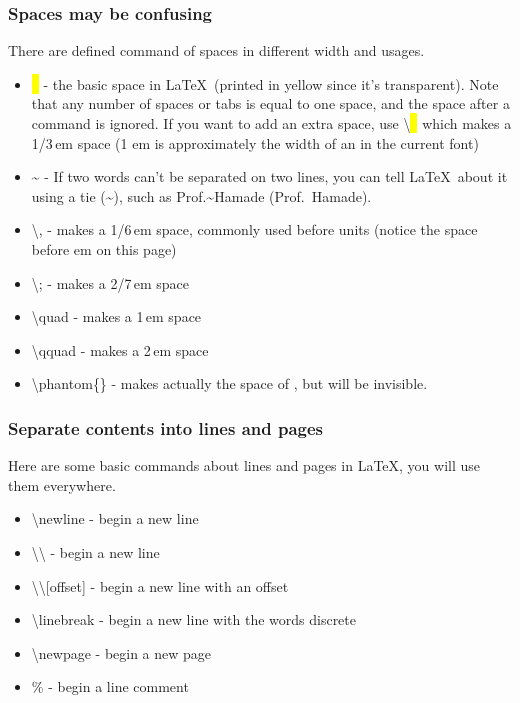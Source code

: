 \documentclass{beamer}
\begin{document}
\begin{frame}
	\frametitle{Spaces may be confusing}
	There are defined command of spaces in different width and usages.
	\begin{itemize}
		\item \colorbox{yellow}{\ } - the basic space in \LaTeX\ (printed in yellow since it's transparent). Note that any number of spaces or tabs is equal to one space, and the space after a command is ignored. If you want to add an extra space, use \alert{\textbackslash}\colorbox{yellow}{\ } which makes a 1/3\,em space (1 em is approximately the width of an  in the current font)
		\item \~{} - If two words can't be separated on two lines, you can tell \LaTeX\ about it using a tie (\~{}), such as Prof.\~{}Hamade (Prof.~Hamade).
		\item  \alert{\textbackslash ,} - makes a 1/6\,em space, commonly used before units (notice the space before em on this page)
		\item  \alert{\textbackslash ;} - makes a 2/7\,em space
		\item  \alert{\textbackslash quad} - makes a 1\,em space
		\item  \alert{\textbackslash qquad} - makes a 2\,em space
		\item  \alert{\textbackslash phantom}\{\} - makes actually the space of , but  will be invisible.
	\end{itemize}
\end{frame}

\begin{frame}
	\frametitle{Separate contents into lines and pages}
	Here are some basic commands about lines and pages in \LaTeX, you will use them everywhere.
	\begin{itemize}
		\item \alert{\textbackslash newline} - begin a new line
		\item \alert{\textbackslash\textbackslash} - begin a new line
		\item \alert{\textbackslash\textbackslash[offset]} - begin a new line with an offset
		\item \alert{\textbackslash linebreak} - begin a new line with the words discrete
		\item \alert{\textbackslash newpage} - begin a new page
		\item \alert{\%} - begin a line comment
	\end{itemize}
\end{frame}
\end{document}
